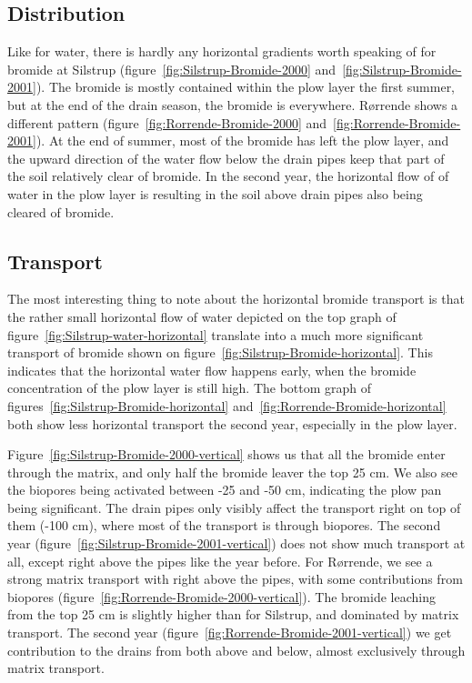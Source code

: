 \subsection{Distribution}

Like for water, there is hardly any horizontal gradients worth
speaking of for bromide at Silstrup
(figure~\ref{fig:Silstrup-Bromide-2000}
and~\ref{fig:Silstrup-Bromide-2001}).  The bromide is mostly contained
within the plow layer the first summer, but at the end of the drain
season, the bromide is everywhere.  R{\o}rrende shows a different pattern
(figure~\ref{fig:Rorrende-Bromide-2000}
and~\ref{fig:Rorrende-Bromide-2001}).  At the end of summer, most of the
bromide has left the plow layer, and the upward direction of the water
flow below the drain pipes keep that part of the soil relatively clear
of bromide.  In the second year, the horizontal flow of of water in
the plow layer is resulting in the soil above drain pipes also being
cleared of bromide.

\subsection{Transport}

The most interesting thing to note about the horizontal bromide
transport is that the rather small horizontal flow of water depicted
on the top graph of figure~\ref{fig:Silstrup-water-horizontal}
translate into a much more significant transport of bromide shown on
figure~\ref{fig:Silstrup-Bromide-horizontal}.  This indicates that the
horizontal water flow happens early, when the bromide concentration of
the plow layer is still high.  The bottom graph of
figures~\ref{fig:Silstrup-Bromide-horizontal}
and~\ref{fig:Rorrende-Bromide-horizontal} both show less horizontal transport
the second year, especially in the plow layer.

Figure~\ref{fig:Silstrup-Bromide-2000-vertical} shows us that all the
bromide enter through the matrix, and only half the bromide leaver the
top 25 cm.  We also see the biopores being activated between -25 and
-50 cm, indicating the plow pan being significant.  The drain pipes
only visibly affect the transport right on top of them (-100 cm),
where most of the transport is through biopores.  The second year
(figure~\ref{fig:Silstrup-Bromide-2001-vertical}) does not show much
transport at all, except right above the pipes like the year before.  For
R{\o}rrende, we see a strong matrix transport with right above the pipes, with
some contributions from biopores
(figure~\ref{fig:Rorrende-Bromide-2000-vertical}).  The bromide leaching
from the top 25 cm is slightly higher than for Silstrup, and dominated
by matrix transport.  The second year
(figure~\ref{fig:Rorrende-Bromide-2001-vertical}) we get contribution to
the drains from both above and below, almost exclusively through
matrix transport.

